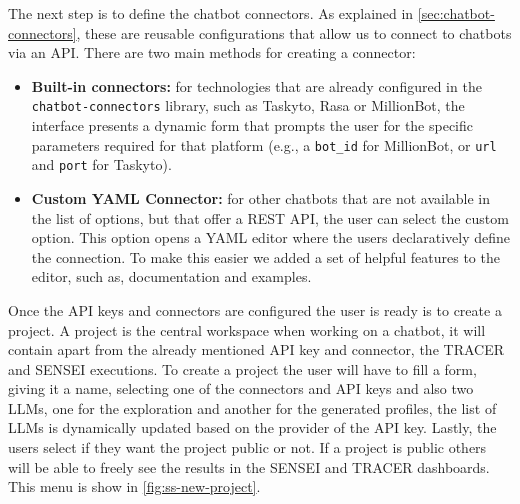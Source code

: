The next step is to define the chatbot connectors.
As explained in \autoref{sec:chatbot-connectors},
these are reusable configurations
that allow us to connect to chatbots via an \ac{API}.
There are two main methods for creating a connector:
\begin{itemize}
  \item \textbf{Built-in connectors:}
    for technologies that are already configured
    in the \texttt{chatbot-connectors} library,
    such as Taskyto, Rasa or MillionBot,
    the interface presents a dynamic form
    that prompts the user for the specific parameters
    required for that platform
    (e.g., a \texttt{bot\_id} for MillionBot,
    or \texttt{url} and \texttt{port} for Taskyto).
  \item \textbf{Custom YAML Connector:}
    for other chatbots that are not available in the list of options,
    but that offer a \ac{REST} \ac{API},
    the user can select the custom option.
    This option opens a YAML editor
    where the users declaratively define the connection.
    To make this easier we added a set of helpful features to the editor,
    such as, documentation and examples.
\end{itemize}


Once the \ac{API} keys and connectors are configured
the user is ready is to create a project.
A project is the central workspace when working on a chatbot,
it will contain apart from the already mentioned \ac{API} key and connector,
the \ac{TRACER} and SENSEI executions.
To create a project the user will have to fill a form,
giving it a name, selecting one of the connectors and \ac{API} keys
and also two \acp{LLM}, one for the exploration and another for the generated profiles,
the list of \acp{LLM} is dynamically updated based on the provider of the \ac{API} key.
Lastly, the users select if they want the project public or not.
If a project is public others will be able to freely see the results
in the SENSEI and \ac{TRACER} dashboards.
This menu is show in \autoref{fig:ss-new-project}.


